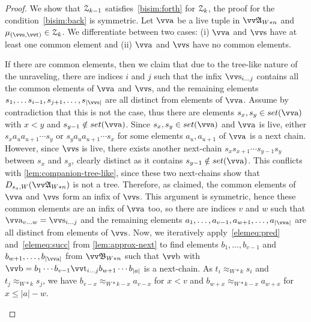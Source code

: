 \begin{proof}
  We show that $\mathcal{Z}_{k-1}$ satisfies~\ref{bisim:forth} for $\mathcal{Z}_{k}$, the proof for the condition~\ref{bisim:back} is symmetric.
  Let $\elemtuptuplea$ be a live tuple in $\unravel{A}_{W * n}$ and $\mu_{(\elemtuptuples, \elemtuptuplet)} \in \bisimZ_{k}$.
  We differentiate between two cases: (i) $\elemtuptuplea$ and $\elemtuptuples$ have at least one common element and (ii) $\elemtuptuplea$ and $\elemtuptuples$ have no common elements.
  \begin{romanenumerate}
    \item
    If there are common elements, then we claim that due to the tree-like nature of the unraveling, there are indices $i$ and $j$ such that the infix $\elemtuptuples_{i\ldots{}j}$ contains all the common elements of $\elemtuptuplea$ and $\elemtuptuples$, and the remaining elements $s_{1}, \ldots s_{i-1}, s_{j+1}, \ldots, s_{|\elemtuptuples|}$ are all distinct from elements of $\elemtuptuplea$.
    Assume by contradiction that this is not the case, thus there are elements $s_{x}, s_{y} \in \set(\elemtuptuplea)$ with $x < y$ and $s_{y-1} \notin \set(\elemtuptuplea)$.
    Since $s_{x}, s_{y} \in \set(\elemtuptuplea)$ and $\elemtuptuplea$ is live, either $s_{x} a_{u} a_{u+1} \cdots s_{y}$ or $s_{y} a_{u} a_{u+1} \cdots s_{x}$ for some elements $a_{u}, a_{u+1}$ of $\elemtuptuplea$ is a next chain.
    However, since $\elemtuptuples$ is live, there exists another next-chain $s_{x} s_{x+1} \cdots s_{y-1} s_{y}$ between $s_{x}$ and $s_{y}$, clearly distinct as it contains $s_{y-1} \notin \set(\elemtuptuplea)$.
    This conflicts with \cref{lem:companion-tree-like}, since these two next-chains show that $D_{s_{x},W}(\unravel{A}_{W * n})$ is not a tree.
    Therefore, as claimed, the common elements of $\elemtuptuplea$ and $\elemtuptuples$ form an infix of $\elemtuptuples$.
    This argument is symmetric, hence these common elements are an infix of $\elemtuptuplea$ too, so there are indices $v$ and $w$ such that $\elemtuptuplea_{v\ldots{}w} = \elemtuptuples_{i\ldots{}j}$ and the remaining elements $a_1, \ldots, a_{v-1}, a_{w+1}, \ldots, a_{|\elemtuptuplea|}$ are all distinct from elements of $\elemtuptuples$.
    Now, we iteratively apply~\ref{elemeq:pred} and~\ref{elemeq:succ} from \cref{lem:approx-next} to find elements $b_{1}, \ldots, b_{v-1}$ and $b_{w+1}, \ldots, b_{|\elemtuptuplea|}$ from $\unravel{B}_{W * n}$ such that $\elemtuptupleb$ with $\elemtuptupleb = b_{1}\cdots{}b_{v-1}\elemtuptuplet_{i\ldots{}j}b_{w+1}\cdots{}b_{|a|}$ is a next-chain.
    As $t_{i} \approx_{W * k} s_{i}$ and $t_{j} \approx_{W * k} s_{j}$, we have $b_{v-x} \approx_{W * k - x} a_{v-x}$ for $x < v$ and $b_{w+x} \approx_{W * k - x} a_{w+x}$ for $x \le |a|-w$.

\end{romanenumerate}
\end{proof}
